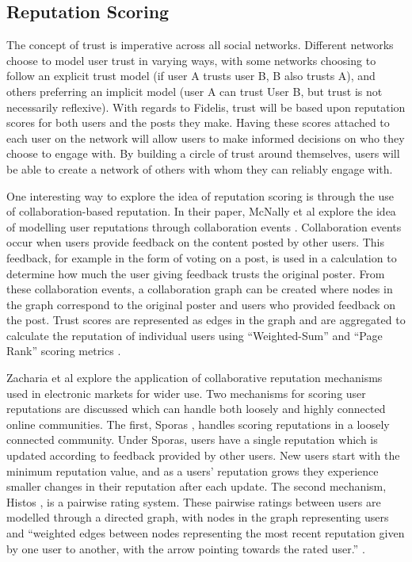 \subsection{Reputation Scoring}
The concept of trust is imperative across all social networks. Different networks choose to model user trust in varying ways, with some networks choosing to follow an explicit trust model (if user A trusts user B, B also trusts A), and others preferring an implicit model (user A can trust User B, but trust is not necessarily reflexive). With regards to Fidelis, trust will be based upon reputation scores for both users and the posts they make. Having these scores attached to each user on the network will allow users to make informed decisions on who they choose to engage with. By building a circle of trust around themselves, users will be able to create a network of others with whom they can reliably engage with.

One interesting way to explore the idea of reputation scoring is through the use of collaboration-based reputation. In their paper, McNally et al explore the idea of modelling user reputations through collaboration events \cite{mcnally2013}. Collaboration events occur when users provide feedback on the content posted by other users. This feedback, for example in the form of voting on a post, is used in a calculation to determine how much the user giving feedback trusts the original poster. From these collaboration events, a collaboration graph can be created where nodes in the graph correspond to the original poster and users who provided feedback on the post. Trust scores are represented as edges in the graph and are aggregated to calculate the reputation of individual users using ``Weighted-Sum'' and ``Page Rank'' scoring metrics \cite{mcnally2013}.

Zacharia et al explore the application of collaborative reputation mechanisms used in electronic markets for wider use. Two mechanisms for scoring user reputations are discussed which can handle both loosely and highly connected online communities. The first, Sporas \cite{zacharia2000}, handles scoring reputations in a loosely connected community. Under Sporas, users have a single reputation which is updated according to feedback provided by other users. New users start with the minimum reputation value, and as a users' reputation grows they experience smaller changes in their reputation after each update. The second mechanism, Histos \cite{zacharia2000}, is a pairwise rating system. These pairwise ratings between users are modelled through a directed graph, with nodes in the graph representing users and ``weighted edges between nodes representing the most recent reputation given by one user to another, with the arrow pointing towards the rated user.'' \cite{zacharia2000}.

